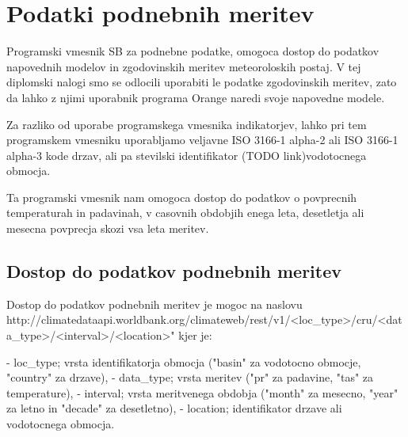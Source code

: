 \section{Podatki podnebnih meritev}

Programski vmesnik SB za podnebne podatke, omogoca dostop do podatkov 
napovednih modelov in zgodovinskih meritev meteoroloskih postaj. V tej 
diplomski nalogi smo se odlocili uporabiti le podatke zgodovinskih meritev, 
zato da lahko z njimi uporabnik programa Orange naredi svoje napovedne modele.

Za razliko od uporabe programskega vmesnika indikatorjev, lahko pri tem
programskem vmesniku uporabljamo veljavne ISO 3166-1 alpha-2 ali ISO 3166-1 
alpha-3 kode drzav, ali pa stevilski identifikator (TODO link)vodotocnega 
obmocja.

Ta programski vmesnik nam omogoca dostop do podatkov o povprecnih temperaturah 
in padavinah, v casovnih obdobjih enega leta, desetletja ali mesecna povprecja 
skozi vsa leta meritev.



\subsection{Dostop do podatkov podnebnih meritev}

Dostop do podatkov podnebnih meritev je mogoc na naslovu
http://climatedataapi.worldbank.org/climateweb/rest/v1/<loc\_type>/cru/<data\_type>/<interval>/<location>"  
kjer je:

- loc\_type; vrsta identifikatorja obmocja ("basin" za vodotocno obmocje, 
  "country" za drzave),
- data\_type; vrsta meritev ("pr" za padavine, "tas" za temperature),
- interval; vrsta meritvenega obdobja ("month" za mesecno, "year" za letno in
  "decade" za desetletno),
- location; identifikator drzave ali vodotocnega obmocja.














